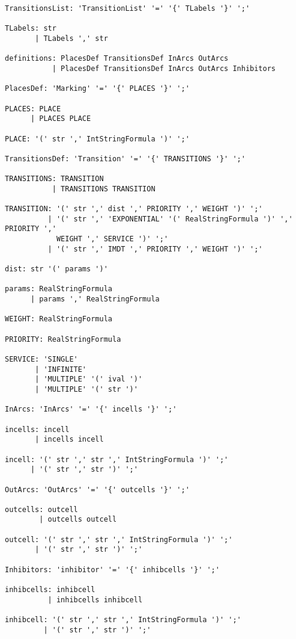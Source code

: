 \documentclass{article}
\begin{document}
\begin{verbatim}
TransitionsList: 'TransitionList' '=' '{' TLabels '}' ';'

TLabels: str
       | TLabels ',' str

definitions: PlacesDef TransitionsDef InArcs OutArcs
           | PlacesDef TransitionsDef InArcs OutArcs Inhibitors

PlacesDef: 'Marking' '=' '{' PLACES '}' ';'

PLACES: PLACE
      | PLACES PLACE

PLACE: '(' str ',' IntStringFormula ')' ';'

TransitionsDef: 'Transition' '=' '{' TRANSITIONS '}' ';'

TRANSITIONS: TRANSITION
           | TRANSITIONS TRANSITION

TRANSITION: '(' str ',' dist ',' PRIORITY ',' WEIGHT ')' ';'
          | '(' str ',' 'EXPONENTIAL' '(' RealStringFormula ')' ',' PRIORITY ',' 
            WEIGHT ',' SERVICE ')' ';'
          | '(' str ',' IMDT ',' PRIORITY ',' WEIGHT ')' ';'

dist: str '(' params ')'

params: RealStringFormula
      | params ',' RealStringFormula

WEIGHT: RealStringFormula

PRIORITY: RealStringFormula

SERVICE: 'SINGLE'
       | 'INFINITE'
       | 'MULTIPLE' '(' ival ')'
       | 'MULTIPLE' '(' str ')'

InArcs: 'InArcs' '=' '{' incells '}' ';'

incells: incell
       | incells incell

incell: '(' str ',' str ',' IntStringFormula ')' ';'
      | '(' str ',' str ')' ';'

OutArcs: 'OutArcs' '=' '{' outcells '}' ';'

outcells: outcell
        | outcells outcell

outcell: '(' str ',' str ',' IntStringFormula ')' ';'
       | '(' str ',' str ')' ';'

Inhibitors: 'inhibitor' '=' '{' inhibcells '}' ';'

inhibcells: inhibcell
          | inhibcells inhibcell

inhibcell: '(' str ',' str ',' IntStringFormula ')' ';'
         | '(' str ',' str ')' ';'
\end{verbatim}
\end{document}
